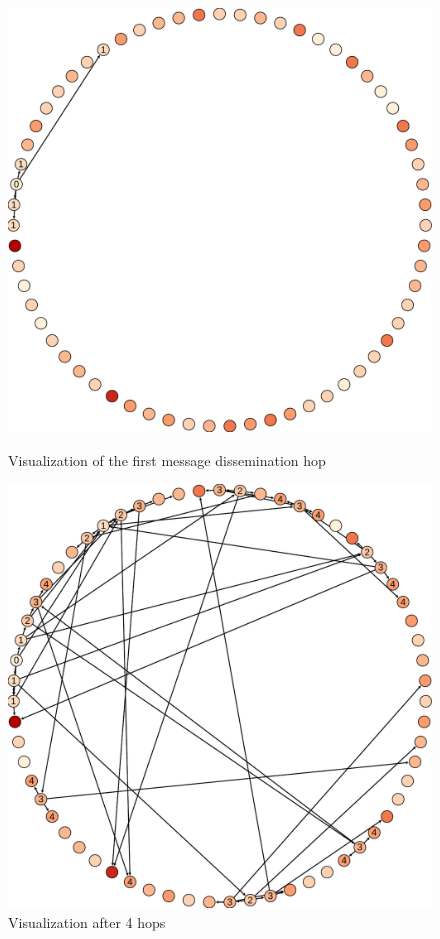 \begin{figure}[h]
    \centering
    \includegraphics[scale=0.5]{figures/diss_1}
    \caption{Visualization of the first message dissemination hop}
    \label{fig:diss_1}
    \includegraphics[scale=0.5]{figures/diss_2}
    \caption{Visualization after 4 hops}
    \label{fig:diss_2}
\end{figure}


